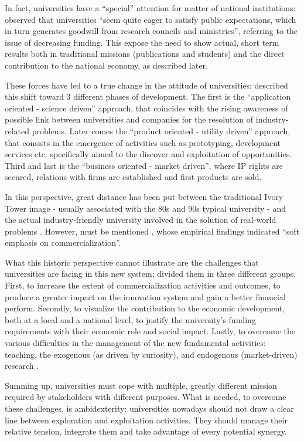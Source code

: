 In fact, universities have a \enquote{special} attention for matter of national institutions: \citet{Rasmussen2006} observed that universities \enquote{seem quite eager to satisfy public expectations, which in turn generates goodwill from research councils and ministries}, referring to the issue of decreasing funding. This expose the need to show actual, short term results both in traditional missions (publications and students) and the direct contribution to the national economy, as described later.

These forces have led to a true change in the attitude of universities; \citet{Tijssen2006} described this shift toward 3 different phases of development. The first is the \enquote{application oriented - science driven} approach, that coincides with the rising awareness of possible link between universities and companies for the resolution of industry-related problems. Later comes the \enquote{product oriented - utility driven} approach, that consists in the emergence of activities such as prototyping, development services etc. specifically aimed to the discover and exploitation of opportunities. Third and last is the \enquote{business oriented - market driven}, where IP rights are secured, relations with firms are established and first products are sold.

In this perspective, great distance has been put between the traditional Ivory Tower image - usually associated with the 80s and 90s typical university - and the actual industry-friendly university involved in the solution of real-world problems \citep{Baldini2006}. However, must be mentioned \citet{Rasmussen2006}, whose empirical findings indicated \enquote{soft emphasis on commercialization}.

What this historic perspective cannot illustrate are the challenges that universities are facing in this new system; \citet{Rasmussen2006} divided them in three different groups. First, to increase the extent of commercialization activities and outcomes, to produce a greater impact on the innovation system and gain a better financial perform. Secondly, to visualize the contribution to the economic development, both at a local and a national level, to justify the university's funding requirements with their economic role and social impact. Lastly, to overcome the various difficulties in the management of the new fundamental activities: teaching, the exogenous (as driven by curiosity), and endogenous (market-driven) research \citep{Debackere2005}. 

Summing up, universities must cope with multiple, greatly different mission required by stakeholders with different purposes. What is needed, to overcome these challenges, is ambidexterity: universities nowadays should not draw a clear line between exploration and exploitation activities. They should manage their relative tension, integrate them and take advantage of every potential synergy.

